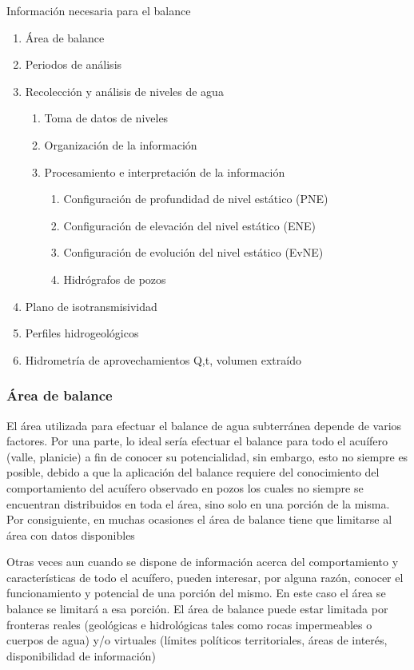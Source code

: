 Información necesaria para el balance
\begin{enumerate}
    \item Área de balance
    \item Periodos de análisis
    \item Recolección y análisis de niveles de agua \begin{enumerate}
        \item Toma de datos de niveles
        \item Organización de la información
        \item Procesamiento e interpretación de la información \begin{enumerate}
            \item Configuración de profundidad de nivel estático (PNE)
            \item Configuración de elevación del nivel estático (ENE)
            \item Configuración de evolución del nivel estático (EvNE)
            \item Hidrógrafos de pozos
        \end{enumerate}
    \end{enumerate}
    \item Plano de isotransmisividad
    \item Perfiles hidrogeológicos
    \item Hidrometría de aprovechamientos Q,t, volumen extraído
\end{enumerate}
\subsubsection{Área de balance}
El área utilizada para efectuar el balance de agua subterránea depende de varios factores. Por una parte, lo ideal sería efectuar el balance para todo el acuífero (valle, planicie) a fin de conocer su potencialidad, sin embargo, esto no siempre es posible, debido a que la aplicación del balance requiere del conocimiento del comportamiento del acuífero observado en pozos los cuales no siempre se encuentran distribuidos en toda el área, sino solo en una porción de la misma. Por consiguiente, en muchas ocasiones el área de balance tiene que limitarse al área con datos disponibles

Otras veces aun cuando se dispone de información acerca del comportamiento y características de todo el acuífero, pueden interesar, por alguna razón, conocer el funcionamiento y potencial de una porción del mismo. En este caso el área se balance se limitará a esa porción. El área de balance puede estar limitada por fronteras reales (geológicas e hidrológicas tales como rocas impermeables o cuerpos de agua) y/o virtuales (límites políticos territoriales, áreas de interés, disponibilidad de información)


